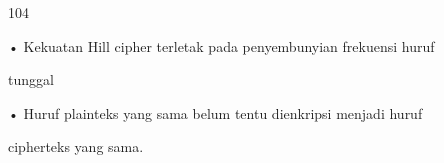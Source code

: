 \documentclass{article}
\begin{document}

104

• Kekuatan Hill cipher terletak pada penyembunyian frekuensi huruf 

tunggal

• Huruf plainteks yang sama belum tentu dienkripsi menjadi huruf 

cipherteks yang sama.
\end{document}
